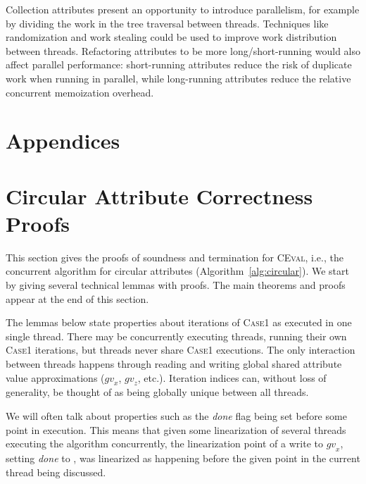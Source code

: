 {Collection attributes present an opportunity to introduce parallelism, for example
by dividing the work in the tree traversal between threads.  Techniques like
randomization and work stealing could be used to improve work distribution between
threads.
Refactoring attributes to be more long/short-running would also affect parallel performance:
short-running attributes reduce the risk of duplicate work when running in parallel, while
long-running attributes reduce the relative concurrent memoization overhead.

{\raggedright
\printbibliography[segment=\therefsegment,heading=subbibliography]
}

\appendix
{}
\section*{Appendices}

\renewcommand{\thesection}{\Alph{section}}

\section{Circular Attribute Correctness Proofs}
\label{circular-proofs}

This section gives the proofs of soundness and termination for \textsc{CEval}, i.e., the concurrent
algorithm for circular attributes (Algorithm~\ref{alg:circular}).  We start by giving several
technical lemmas with proofs.  The main theorems and proofs appear at the end of this section.

The lemmas below state properties about iterations of \textsc{Case1} as executed in one single
thread.  There may be concurrently executing threads, running their own \textsc{Case1} iterations,
but threads never share \textsc{Case1} executions.
The only interaction between threads happens through
reading and writing global shared attribute value approximations ($\mathit{gv}_x$, $\mathit{gv}_z$, etc.).
Iteration indices can, without loss of generality, be thought of
as being globally unique between all threads.

We will often talk about properties such as the \emph{done} flag being set before some point
in execution. This means that given some linearization of several threads executing the algorithm
concurrently, the linearization point of a write to $\mathit{gv}_x$, setting \emph{done} to
\true{}, was linearized
as happening before the given point in the current thread being discussed.

}
